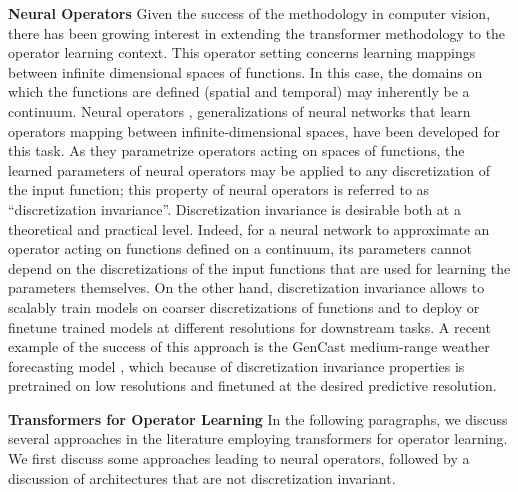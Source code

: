 \documentclass[twoside]{article}
\newcommand{\1}{\mathbbm{1}}
\begin{document}
\textbf{Neural Operators} Given the success of the methodology in computer vision, there has been growing interest in extending the transformer methodology to the operator learning context. This operator setting concerns learning mappings between infinite dimensional spaces of functions. In this case, the domains on which the functions are defined (spatial and temporal) may inherently be a continuum. Neural operators \citep{kovachki2023neural}, generalizations of neural networks that learn operators mapping between infinite-dimensional spaces, have been developed for this task. As they parametrize operators acting on spaces of functions, the learned parameters of neural operators may be applied to any discretization of the input function; this property of neural operators is referred to as ``discretization invariance''. Discretization invariance is desirable both at a theoretical and practical level. Indeed, for a neural network to approximate an operator acting on functions defined on a continuum, its parameters cannot depend on the discretizations of the input functions that are used for learning the parameters themselves. On the other hand, discretization invariance allows to scalably train models on coarser discretizations of functions and to deploy or finetune trained models at different resolutions for downstream tasks. A recent example of the success of this approach is the GenCast medium-range weather forecasting model \citep{Price2025}, which because of discretization invariance properties is pretrained on low resolutions and finetuned at the desired predictive resolution.
\par
\textbf{Transformers for Operator Learning} In the following paragraphs, we discuss several approaches in the literature employing transformers for operator learning. We first discuss some approaches leading to neural operators, followed by a discussion of architectures that are not discretization invariant.
\par 
\end{document}
